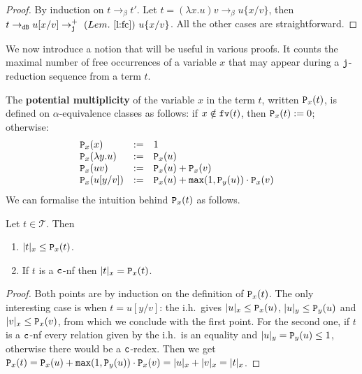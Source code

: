 \documentclass{LMCS}
\renewcommand{\>}{\rightarrow}
\def\lam{\lambda}
\newcommand{\Rew}[1]{\rightarrow_{#1}}
\newcommand{\isubs}[1]{ \{ #1  \} }
\newcommand{\B}{{\tt dB}}
\newcommand{\dis}{{\tt j}}
\newcommand{\Rewplus}[1]{\rightarrow^{+}_{#1}}
\newcommand{\fv}[1]{{\tt fv}(#1)}
\newcommand{\DSubs}{{\tt c}}
\newcommand{\mul}[2]{{\tt P}_{#2}(#1)}
\newcommand{\ih}{i.h.}
\newcommand{\terms}{\mathcal{T}}
\newcommand{\deft}[1]{{\bf #1}}
\newcommand{\maxi}[2]{{\tt max}(#1,#2)}
\begin{document}
\begin{proof}
By induction on $t \Rew{\beta} t'$.
Let  $t=(\lam  x.  u)  v \Rew{\beta}
u\isubs{x/v}$, then  $t\Rew{\B}  u[x/v] \Rewplus{\dis}\ (Lem.~\ref{l:fc})\ 
u\isubs{x/v}$. All the other cases are straightforward.
\end{proof}


We now introduce a notion that will be useful in various proofs. 
It counts the maximal number of free occurrences of a variable $x$ that may appear during
a $\dis$-reduction sequence from a term $t$. 

The \deft{potential multiplicity} of the variable $x$ in the term $t$, written $\mul{t}{x}$, 
is defined on $\alpha$-equivalence classes as follows:  
if  $x \notin \fv{t}$, then 
$\mul{t}{x}  :=  0$; otherwise:
\[ \begin{array}{llll}
   \mul{x}{x} & := & 1 & \\
   \mul{\lam y. u}{x} & := & \mul{u}{x} & \\
   \mul{u v}{x} & := & \mul{u}{x} + \mul{v}{x} & \\
   \mul{u[y/v]}{x} & := & \mul{u}{x} + \maxi{1}{\mul{u}{y}} \cdot \mul{v}{x} \\
 \end{array} \]
We can formalise the intuition behind $\mul{t}{x}$ as follows.

\begin{lem}
\label{l:mul-occ} Let $t \in \terms$.   Then 
\begin{enumerate}[\rm(1)]
\item \label{l:mo-one}$|t|_x\leq \mul{t}{x}$.
\item If $t$ is a $\DSubs$-nf then $|t|_x=\mul{t}{x}$.
\end{enumerate}
\end{lem}

\begin{proof}
Both points  are by induction  on the definition of  $\mul{t}{x}$. The
only  interesting  case  is  when  $t=u[y/v]$: the  \ih\  gives
$|u|_x\leq\mul{u}{x}$,            $|u|_y\leq\mul{u}{y}$            and
$|v|_x\leq\mul{v}{x}$, from which we conclude with the first point. 
For the second one, if $t$ is a $\DSubs$-nf
every   relation   given   by    the   \ih\   is   an   equality   and
$|u|_y=\mul{u}{y}\leq    1$,    otherwise    there    would    be    a
$\DSubs$-redex.                Then               we               get
$\mul{t}{x}=\mul{u}{x}+\maxi{1}{\mul{u}{y}}\cdot\mul{v}{x}=|u|_x+|v|_x=|t|_x$.
\end{proof}
\end{document}

